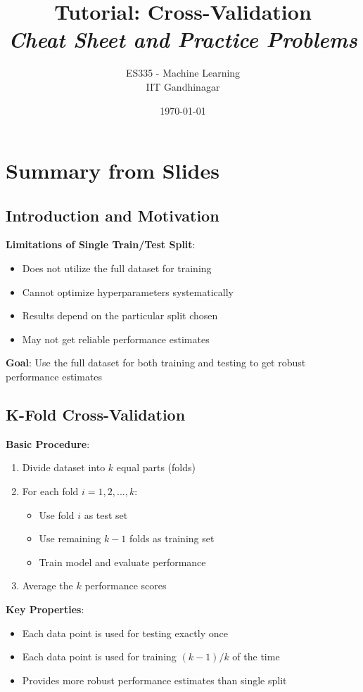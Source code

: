 \documentclass{article}
\title{\textbf{Tutorial: Cross-Validation} \\ \textit{Cheat Sheet and Practice Problems}}
\author{ES335 - Machine Learning \\ IIT Gandhinagar}
\date{\today}
\begin{document}
\maketitle

\section{Summary from Slides}

\subsection{Introduction and Motivation}

\textbf{Limitations of Single Train/Test Split}:
\begin{itemize}
    \item Does not utilize the full dataset for training
    \item Cannot optimize hyperparameters systematically
    \item Results depend on the particular split chosen
    \item May not get reliable performance estimates
\end{itemize}

\textbf{Goal}: Use the full dataset for both training and testing to get robust performance estimates

\subsection{K-Fold Cross-Validation}

\textbf{Basic Procedure}:
\begin{enumerate}
    \item Divide dataset into $k$ equal parts (folds)
    \item For each fold $i = 1, 2, ..., k$:
    \begin{itemize}
        \item Use fold $i$ as test set
        \item Use remaining $k-1$ folds as training set
        \item Train model and evaluate performance
    \end{itemize}
    \item Average the $k$ performance scores
\end{enumerate}

\textbf{Key Properties}:
\begin{itemize}
    \item Each data point is used for testing exactly once
    \item Each data point is used for training $(k-1)/k$ of the time
    \item Provides more robust performance estimates than single split
\end{itemize}
\end{document}

